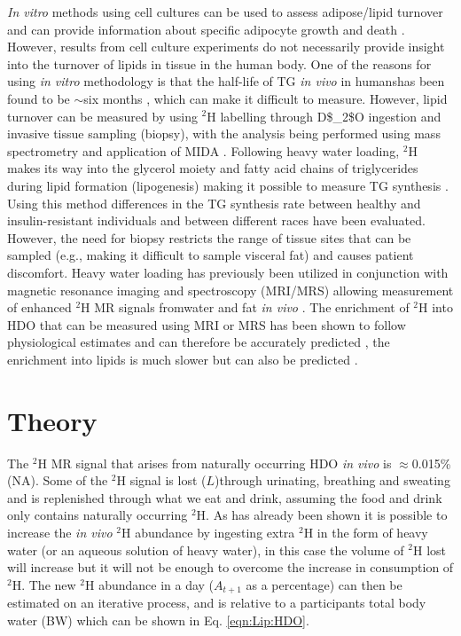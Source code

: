 \textit{In vitro} methods using cell cultures can be used to assess adipose/lipid turnover and can provide information about specific adipocyte growth and death \cite{Tchkonia2002FatPreadipocytes}. However, results from cell culture experiments do not necessarily provide insight into the turnover of lipids in tissue in the human body. One of the reasons for using \textit{in vitro} methodology is that the half-life of \ac{TG} \textit{in vivo} in humanshas been found to be $\sim$six months \cite{Strawford2004AdiposeO}, which can make it difficult to measure. However, lipid turnover can be measured by using $^2$H labelling through \ac{D$_2$O} ingestion and invasive tissue sampling (biopsy), with the analysis being performed using mass spectrometry and application of \ac{MIDA} \cite{White2019DynamicsDisease, Strawford2004AdiposeO, Belew2022DeTracers, Turner2003MeasurementMIDA}. Following heavy water loading, $^2$H makes its way into the glycerol moiety and fatty acid chains of triglycerides during lipid formation (lipogenesis) making it possible to measure TG synthesis \cite{Turner2003MeasurementMIDA}. Using this method differences in the \ac{TG} synthesis rate between healthy and insulin-resistant individuals \cite{Allister2015InHumans} and between different races \cite{White2018RacialHumans} have been evaluated. However, the need for biopsy restricts the range of tissue sites that can be sampled (e.g., making it difficult to sample visceral fat) and causes patient discomfort. Heavy water loading has previously been utilized in conjunction with magnetic resonance imaging and spectroscopy (\ac{MRI}/\ac{MRS}) allowing measurement of enhanced $^2$H MR signals fromwater and fat \textit{in vivo} \cite{Brereton1989TheMice, Cocking2023DeuteriumDosing}. The enrichment of $^2$H into \ac{HDO} that can be measured using \ac{MRI} or \ac{MRS} has been shown to follow physiological estimates and can therefore be accurately predicted \cite{Cocking2023DeuteriumDosing}, the enrichment into lipids is much slower \cite{White2019DynamicsDisease, Strawford2004AdiposeO} but can also be predicted \cite{White2019DynamicsDisease}.

\section{Theory}
\label{Chap:Lip:Theory}

The $^2$H MR signal that arises from naturally occurring \ac{HDO} \textit{in vivo} is $\approx$0.015\% (NA). Some of the $^2$H signal is lost ($L$)through urinating, breathing and sweating and is replenished through what we eat and drink, assuming the food and drink only contains naturally occurring $^2$H. As has already been shown it is possible to increase the \textit{in vivo} $^2$H abundance by ingesting extra $^2$H in the form of heavy water (or an aqueous solution of heavy water), in this case the volume of $^2$H lost will increase but it will not be enough to overcome the increase in consumption of $^2$H. The new $^2$H abundance in a day ($A_{t+1}$ as a percentage) can then be estimated on an iterative process, and is relative to a participants total body water (BW) which can be shown in Eq. \ref{eqn:Lip:HDO}.

